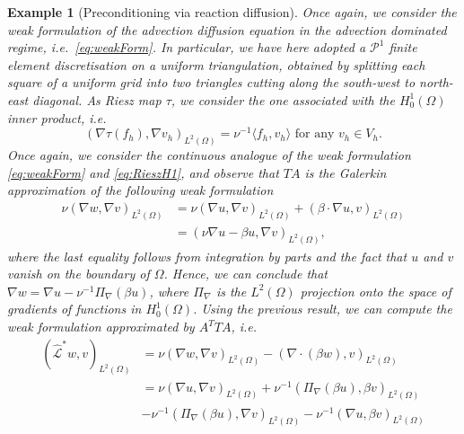 \documentclass[hidelinks,onefignum,onetabnum]{siamart220329}
\newtheorem{example}{Example}
\begin{document}
\begin{example}[Preconditioning via reaction diffusion]
    \label{ex:H1InnerProduct}
    Once again, we consider the weak formulation of the advection diffusion equation in the advection dominated regime, i.e.~\eqref{eq:weakForm}.
    In particular, we have here adopted a $\mathcal{P}^1$ finite element discretisation on a uniform triangulation, obtained by splitting each square of a uniform grid into two triangles cutting along the south-west to north-east diagonal.
    As Riesz map $\tau$, we consider the one associated with the $H^1_0(\Omega)$ inner product, i.e.
    \begin{equation}
        \label{eq:RieszH1}
        (\nabla \tau(f_h),\nabla v_h)_{L^2(\Omega)} = \nu^{-1}\langle f_h, v_h\rangle \text{ for any } v_h \in V_h.
    \end{equation}
    Once again, we consider the continuous analogue of the weak formulation \eqref{eq:weakForm} and \eqref{eq:RieszH1}, and observe that $TA$ is the Galerkin approximation of the following weak formulation
    \begin{align}
        \nu(\nabla w,\nabla v)_{L^2(\Omega)} & = \nu (\nabla u, \nabla v)_{L^2(\Omega)} + (\beta\cdot \nabla u,v)_{L^2(\Omega)} \\
                                             & = (\nu \nabla u - \beta u,\nabla v)_{L^2(\Omega)},
    \end{align}
    where the last equality follows from integration by parts and the fact that $u$ and $v$ vanish on the boundary of $\Omega$.
    Hence, we can conclude that $\nabla w = \nabla u - \nu^{-1}\Pi_{\nabla} (\beta u)$, where $\Pi_{\nabla}$ is the $L^2(\Omega)$ projection onto the space of gradients of functions in $H^1_0(\Omega)$.
    Using the previous result, we can compute the weak formulation approximated by $A^TTA$, i.e.
    \begin{align}
        \label{eq:weakFormNormalH1}
        (\hat{\mathcal{L}}^*w,v)_{L^2(\Omega)} & = \nu(\nabla w,\nabla v)_{L^2(\Omega)} - (\nabla\cdot(\beta w),v)_{L^2(\Omega)}                                  \\
                                               & = \nu ( \nabla u, \nabla v)_{L^2(\Omega)} + \nu^{-1}(\Pi_{\nabla}(\beta u),\beta v)_{L^2(\Omega)}                \\
                                               & - \nu^{-1} (\Pi_{\nabla}(\beta u),\nabla v)_{L^2(\Omega)} - \nu^{-1}(\nabla u ,\beta v)_{L^2(\Omega)}            \\

\end{align}
\end{example}
\end{document}
